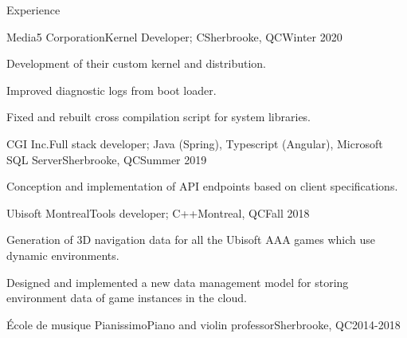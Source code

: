 \documentclass{article}
\newlength{\tabin}
\newlength{\secsep}
\newcommand{\lineunder}{\vspace*{-8pt} \\ \hspace*{-6pt} \hrulefill \\ \vspace*{-15pt}}
\newenvironment{tabbedsection}[1]{
  \begin{list}{}{
      \setlength{\itemsep}{0pt}
      \setlength{\labelsep}{0pt}
      \setlength{\labelwidth}{0pt}
      \setlength{\leftmargin}{\tabin}
      \setlength{\rightmargin}{\tabin}
      \setlength{\listparindent}{0pt}
      \setlength{\parsep}{0pt}
      \setlength{\parskip}{0pt}
      \setlength{\partopsep}{0pt}
      \setlength{\topsep}{#1}
    }
  \item[]
}{\end{list}}
\newenvironment{resume_section}[1]{
  \filbreak
  \vspace{2\secsep}
  \textsc{\large#1}
  \lineunder
  \begin{tabbedsection}{\secsep}
}{\end{tabbedsection}}
\newenvironment{subitems}{
  \renewcommand{\labelitemi}{-}
  \begin{itemize}
      \setlength{\labelsep}{1em}
}{\end{itemize}}
\newenvironment{resume_employer}[4]{
  \vspace{\secsep}
  \textbf{#1} \\ 
  \indent {\small #2} \hfill {\footnotesize#3 (#4)}
  \begin{tabbedsection}{0pt}
  \begin{subitems}
}{\end{subitems}\end{tabbedsection}}
\begin{document}
\begin{resume_section}{Experience}
  \begin{resume_employer}{Media5 Corporation}{Kernel Developer; C}{Sherbrooke, QC}{Winter 2020}
    \item Development of their custom kernel and distribution.
	\item Improved diagnostic logs from boot loader.
	\item Fixed and rebuilt cross compilation script for system libraries.
  \end{resume_employer}
  \begin{resume_employer}{CGI Inc.}{Full stack developer; Java (Spring), Typescript (Angular), Microsoft SQL Server}{Sherbrooke, QC}{Summer 2019}
    \item Conception and implementation of API endpoints based on client specifications.
  \end{resume_employer}
  
    \begin{resume_employer}{Ubisoft Montreal}{Tools developer; C++}{Montreal, QC}{Fall 2018} 
    \item Generation of 3D navigation data for all the Ubisoft AAA games which use dynamic environments.
    \item Designed and implemented a new data management model for storing environment data of game instances in the cloud.
  \end{resume_employer}
  
  \begin{resume_employer}{École de musique Pianissimo}{Piano and violin professor}{Sherbrooke, QC}{2014-2018}
  \end{resume_employer}
\end{resume_section}
\end{document}
